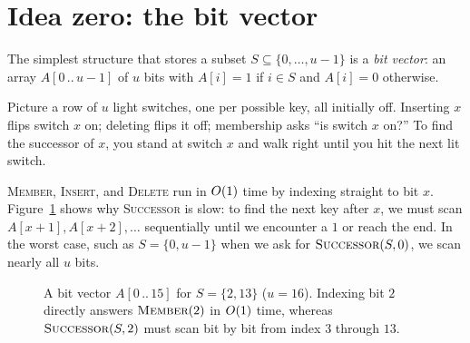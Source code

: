 \section{Idea zero: the bit vector}

The simplest structure that stores a subset $S \subseteq \{0,\dots,u-1\}$ is a
\emph{bit vector}: an array $A[0\,..\,u-1]$ of $u$ bits with $A[i] = 1$ if $i \in S$ and $A[i] = 0$ otherwise.

\begin{intuitionbox}
Picture a row of $u$ light switches, one per possible key, all initially
off. Inserting $x$ flips switch $x$ on; deleting flips it off; membership asks
``is switch $x$ on?'' To find the successor of $x$, you stand at switch $x$ and
walk right until you hit the next lit switch.
\end{intuitionbox}

\textsc{Member}, \textsc{Insert}, and \textsc{Delete} run in $O(1)$
time by indexing straight to bit $x$. Figure~\ref{ch21:bit-vector} shows why \textsc{Successor} is slow: to find the
next key after $x$, we must scan $A[x+1], A[x+2], \dots$ sequentially until we
encounter a $1$ or reach the end. In the worst case, such as $S = \{0, u-1\}$ when
we ask for $\textsc{Successor}(S, 0)$, we scan nearly all $u$ bits.

\begin{figure}[htbp]
\centering
{}
\caption{A bit vector $A[0\,..\,15]$ for $S = \{2, 13\}$ ($u = 16$). Indexing bit $2$ directly answers $\textsc{Member}(2)$ in $O(1)$ time, whereas $\textsc{Successor}(S, 2)$ must scan bit by bit from index $3$ through $13$.}
\label{ch21:bit-vector}
\end{figure}

